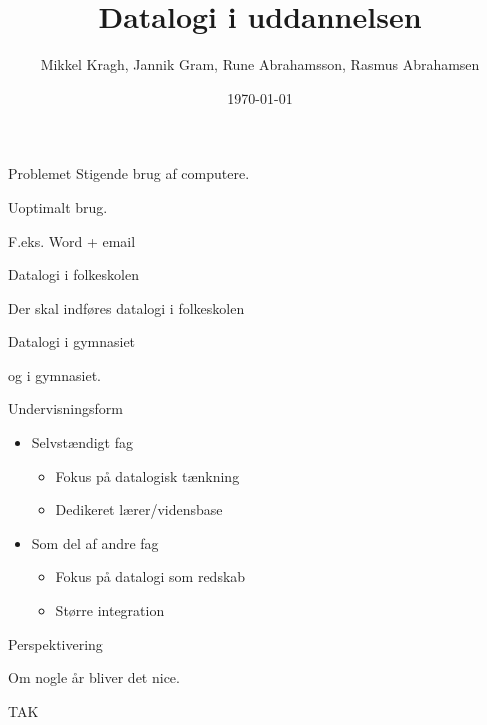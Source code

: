 \documentclass{beamer}
\title[Datalogi i uddannelsen]{Datalogi i uddannelsen}
\author{Mikkel Kragh, Jannik Gram, Rune Abrahamsson, Rasmus Abrahamsen}
\institute{DIKU}
\date{\today}
\begin{document}
\begin{frame}
\titlepage
\end{frame}


\begin{frame}{Problemet}
Stigende brug af computere.

Uoptimalt brug.

F.eks.
Word + email

\end{frame}

\begin{frame}{Datalogi i folkeskolen}

Der skal indføres datalogi i folkeskolen

\end{frame}

\begin{frame}{Datalogi i gymnasiet}

og i gymnasiet.

\end{frame}

\begin{frame}{Undervisningsform}
\begin{itemize}
\item Selvstændigt fag
\begin{itemize}
\item Fokus på datalogisk tænkning
\item Dedikeret lærer/vidensbase
\end{itemize}
\item Som del af andre fag
\begin{itemize}
\item Fokus på datalogi som redskab
\item Større integration
\end{itemize}
\end{itemize}
\end{frame}

\begin{frame}{Perspektivering}

Om nogle år bliver det nice.

\end{frame}

\begin{frame}{TAK}

\end{frame}
\end{document}
